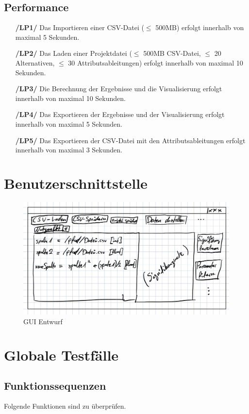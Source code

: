 \documentclass{article}
\begin{document}
\subsection{Performance}
\begin{itemize}
    \item[\textbf{/LP1/}] Das Importieren einer CSV-Datei ($\leq$ 500MB) erfolgt innerhalb von maximal 5 Sekunden.
    \item[\textbf{/LP2/}] Das Laden einer Projektdatei ($\leq$ 500MB CSV-Datei, $\leq$ 20 Alternativen, $\leq$ 30 Attributsableitungen) erfolgt innerhalb von maximal 10 Sekunden.
    \item[\textbf{/LP3/}] Die Berechnung der Ergebnisse und die Visualisierung erfolgt innerhalb von maximal 10 Sekunden.
    \item[\textbf{/LP4/}] Das Exportieren der Ergebnisse und der Visualisierung erfolgt innerhalb von maximal 5 Sekunden.
    \item[\textbf{/LP5/}] Das Exportieren der CSV-Datei mit den Attributsableitungen erfolgt innerhalb von maximal 3 Sekunden.
\end{itemize}

\clearpage
\section{Benutzerschnittstelle}
\begin{figure}[H]%
  \centering
  \includegraphics[width=12cm]{gui.jpeg}
  \caption{GUI Entwurf}
\end{figure}

\clearpage
\section{Globale Testfälle}

\subsection{Funktionssequenzen}
Folgende Funktionen sind zu überprüfen.
\end{document}
